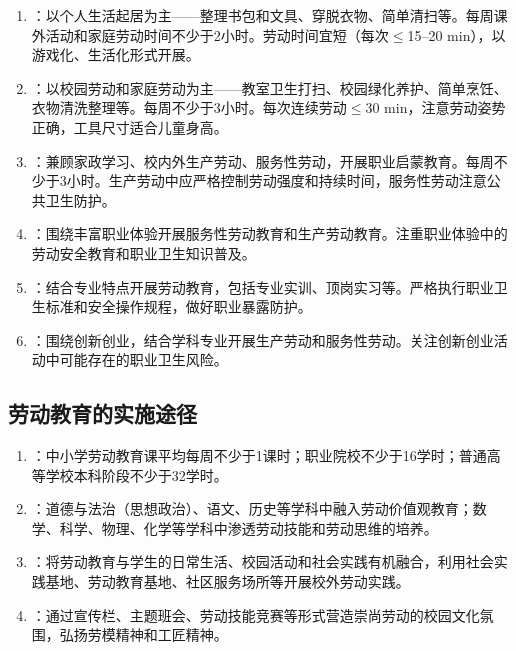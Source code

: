\begin{keybox}
\begin{enumerate}[leftmargin=*]
    \item {}：以个人生活起居为主——整理书包和文具、穿脱衣物、简单清扫等。每周课外活动和家庭劳动时间不少于2小时。劳动时间宜短（每次$\leq$15--20 min），以游戏化、生活化形式开展。
    \item {}：以校园劳动和家庭劳动为主——教室卫生打扫、校园绿化养护、简单烹饪、衣物清洗整理等。每周不少于3小时。每次连续劳动$\leq$30 min，注意劳动姿势正确，工具尺寸适合儿童身高。
    \item {}：兼顾家政学习、校内外生产劳动、服务性劳动，开展职业启蒙教育。每周不少于3小时。生产劳动中应严格控制劳动强度和持续时间，服务性劳动注意公共卫生防护。
    \item {}：围绕丰富职业体验开展服务性劳动教育和生产劳动教育。注重职业体验中的劳动安全教育和职业卫生知识普及。
    \item {}：结合专业特点开展劳动教育，包括专业实训、顶岗实习等。严格执行职业卫生标准和安全操作规程，做好职业暴露防护。
    \item {}：围绕创新创业，结合学科专业开展生产劳动和服务性劳动。关注创新创业活动中可能存在的职业卫生风险。
\end{enumerate}
\end{keybox}

\subsection{劳动教育的实施途径}

\begin{defbox}
\begin{enumerate}[leftmargin=*]
    \item {}：中小学劳动教育课平均每周不少于1课时；职业院校不少于16学时；普通高等学校本科阶段不少于32学时。
    \item {}：道德与法治（思想政治）、语文、历史等学科中融入劳动价值观教育；数学、科学、物理、化学等学科中渗透劳动技能和劳动思维的培养。
    \item {}：将劳动教育与学生的日常生活、校园活动和社会实践有机融合，利用社会实践基地、劳动教育基地、社区服务场所等开展校外劳动实践。
    \item {}：通过宣传栏、主题班会、劳动技能竞赛等形式营造崇尚劳动的校园文化氛围，弘扬劳模精神和工匠精神。
\end{enumerate}
\end{defbox}

